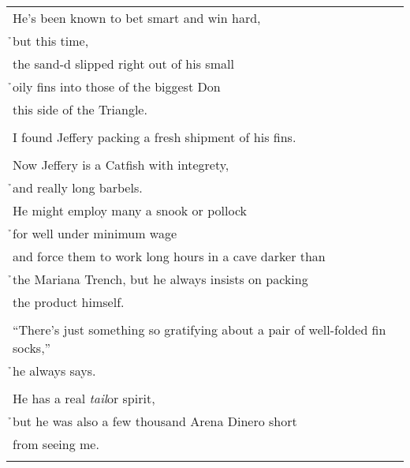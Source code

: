 \documentclass{article}
\begin{document}
\begin{center}
\begin{tabular}{l}
He's been known to bet smart and win hard, \\
\h{}but this time, \\
the sand-d slipped right out of his small \\
\h{}oily fins into those of the biggest Don \\ %
this side of the Triangle. \\
\\
I found Jeffery packing a fresh shipment of his fins. \\
\\
Now Jeffery is a Catfish with integrety, \\
\h{}and really long barbels. \\
He might employ many a snook or pollock \\
\h{}for well under minimum wage \\
and force them to work long hours in a cave darker than \\
\h{}the Mariana Trench, but he always insists on packing \\
the product himself. \\
\\
``There's just something so gratifying about a pair of well-folded fin socks,'' \\
\h{}he always says. \\
\\
He has a real \textit{tail}or spirit, \\
\h{}but he was also a few thousand Arena Dinero short \\ %
from seeing me. \\
\\
\end{tabular}
\end{center}
\end{document}
